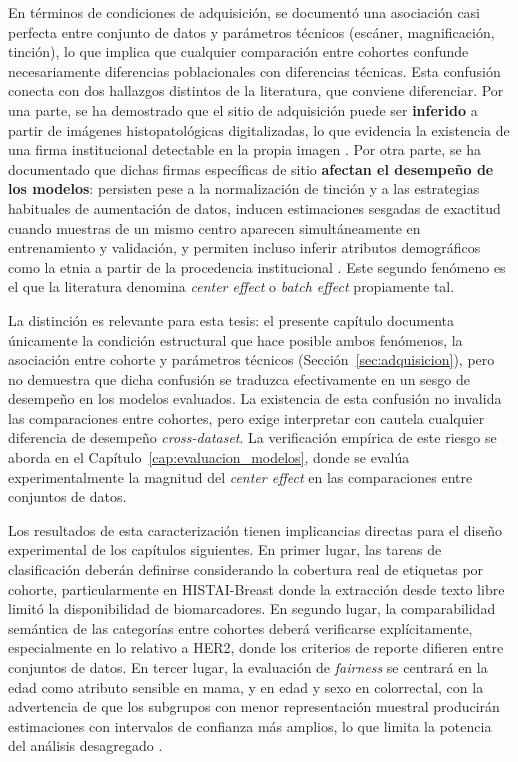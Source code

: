 En términos de condiciones de adquisición, se documentó una asociación casi perfecta entre conjunto de datos y parámetros técnicos (escáner, magnificación, tinción), lo que implica que cualquier comparación entre cohortes confunde necesariamente diferencias poblacionales con diferencias técnicas. Esta confusión conecta con dos hallazgos distintos de la literatura, que conviene diferenciar. Por una parte, se ha demostrado que el sitio de adquisición puede ser \textbf{inferido} a partir de imágenes histopatológicas digitalizadas, lo que evidencia la existencia de una firma institucional detectable en la propia imagen \parencite{alsaafin2023biased}. Por otra parte, se ha documentado que dichas firmas específicas de sitio \textbf{afectan el desempeño de los modelos}: persisten pese a la normalización de tinción y a las estrategias habituales de aumentación de datos, inducen estimaciones sesgadas de exactitud cuando muestras de un mismo centro aparecen simultáneamente en entrenamiento y validación, y permiten incluso inferir atributos demográficos como la etnia a partir de la procedencia institucional \parencite{howard2021site}. Este segundo fenómeno es el que la literatura denomina \textit{center effect} o \textit{batch effect} propiamente tal.

La distinción es relevante para esta tesis: el presente capítulo documenta únicamente la condición estructural que hace posible ambos fenómenos, la asociación entre cohorte y parámetros técnicos (Sección~\ref{sec:adquisicion}), pero no demuestra que dicha confusión se traduzca efectivamente en un sesgo de desempeño en los modelos evaluados. La existencia de esta confusión no invalida las comparaciones entre cohortes, pero exige interpretar con cautela cualquier diferencia de desempeño \textit{cross-dataset}. La verificación empírica de este riesgo se aborda en el Capítulo~\ref{cap:evaluacion_modelos}, donde se evalúa experimentalmente la magnitud del \textit{center effect} en las comparaciones entre conjuntos de datos.

Los resultados de esta caracterización tienen implicancias directas para el diseño experimental de los capítulos siguientes. En primer lugar, las tareas de clasificación deberán definirse considerando la cobertura real de etiquetas por cohorte, particularmente en HISTAI-Breast donde la extracción desde texto libre limitó la disponibilidad de biomarcadores. En segundo lugar, la comparabilidad semántica de las categorías entre cohortes deberá verificarse explícitamente, especialmente en lo relativo a HER2, donde los criterios de reporte difieren entre conjuntos de datos. En tercer lugar, la evaluación de \textit{fairness} se centrará en la edad como atributo sensible en mama, y en edad y sexo en colorrectal, con la advertencia de que los subgrupos con menor representación muestral producirán estimaciones con intervalos de confianza más amplios, lo que limita la potencia del análisis desagregado \parencite{riccilara2022fairness}.

